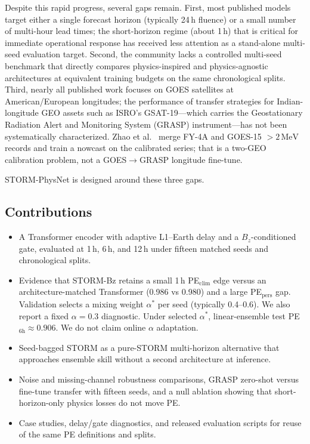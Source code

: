 \documentclass{ieeeaccess}
\begin{document}
Despite this rapid progress, several gaps remain. First, most published models
target either a single forecast horizon (typically 24\,h fluence) or a small
number of multi-hour lead times; the short-horizon regime (about 1\,h) that
is critical for immediate operational response has received less attention as a
stand-alone multi-seed evaluation target. Second, the community lacks a
controlled multi-seed benchmark that directly compares physics-inspired and
physics-agnostic architectures at equivalent training budgets on the same
chronological splits. Third, nearly all published work focuses on GOES satellites
at American/European longitudes; the performance of transfer strategies for
Indian-longitude GEO assets such as ISRO's GSAT-19---which carries the
Geostationary Radiation Alert and Monitoring System (GRASP) instrument---has not
been systematically characterized. Zhao et al.~\cite{b29} merge FY-4A and GOES-15 \(>2\,\mathrm{MeV}\)
records and train a nowcast on the calibrated series; that is a
two-GEO calibration problem, not a GOES\(\rightarrow\)GRASP
longitude fine-tune.

STORM-PhysNet is designed around these three gaps.

\subsection{Contributions}
\begin{itemize}
\item A Transformer encoder with adaptive L1--Earth delay and a
\(B_z\)-conditioned gate, evaluated at 1\,h, 6\,h, and 12\,h under
fifteen matched seeds and chronological splits.
\item Evidence that STORM-Bz retains a small 1\,h PE$_{\mathrm{clim}}$ edge
versus an architecture-matched Transformer (0.986 vs 0.980) and a large
PE$_{\mathrm{pers}}$ gap. Validation selects a mixing weight \(\alpha^*\) per seed (typically 0.4--0.6). We also report a fixed \(\alpha=0.3\) diagnostic. Under selected \(\alpha^*\), linear-ensemble test PE\(_{6\mathrm{h}} \approx 0.906\). We do not claim online \(\alpha\) adaptation.
\item Seed-bagged STORM as a pure-STORM multi-horizon alternative that
approaches ensemble skill without a second architecture at inference.
\item Noise and missing-channel robustness comparisons, GRASP
zero-shot versus fine-tune transfer with fifteen seeds, and a null
ablation showing that short-horizon-only physics losses do not move PE.
\item Case studies, delay/gate diagnostics, and released evaluation
scripts for reuse of the same PE definitions and splits.
\end{itemize}
\end{document}
